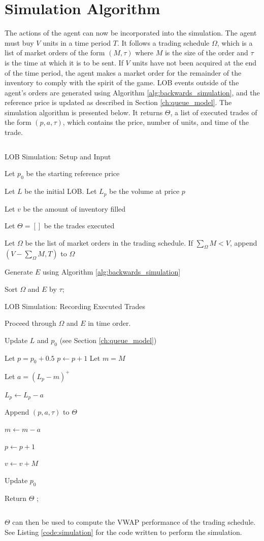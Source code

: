\section{Simulation Algorithm} \label{ch:simulation_algorithm}

The actions of the agent can now be incorporated into the simulation. The agent must buy $V$ units in a time period $T$. It follows a trading schedule $\Omega$, which is a list of market orders of the form $(M,\tau)$ where $M$ is the size of the order and $\tau$ is the time at which it is to be sent. If $V$ units have not been acquired at the end of the time period, the agent makes a market order for the remainder of the inventory to comply with the spirit of the game. LOB events outside of the agent's orders are generated using Algorithm \ref{alg:backwards_simulation}, and the reference price is updated as described in Section \ref{ch:queue_model}. The simulation algorithm is presented below. It returns $\Theta$, a list of executed trades of the form $(p,a,\tau)$, which contains the price, number of units, and time of the trade.

$$ $$

\begin{algorithm}[H]
\SetAlgoLined
\caption{LOB Simulation: Setup and Input}
Let $p_0$ be the starting reference price \;

Let $L$ be the initial LOB. Let $L_p$ be the volume at price $p$ \;

Let $v$ be the amount of inventory filled \;

Let $\Theta = []$ be the trades executed \;

Let $\Omega$ be the list of market orders in the trading schedule. If $\sum\limits_\Omega{M} < V$, append $(V - \sum\limits_\Omega{M}, T)$ to $\Omega$ \;

Generate $E$ using Algorithm \ref{alg:backwards_simulation} \;

Sort $\Omega$ and $E$ by $\tau$;
\end{algorithm}

\begin{algorithm}[H]
\SetAlgoLined
\caption{LOB Simulation: Recording Executed Trades}
Proceed through $\Omega$ and $E$ in time order. 

 {
     {
        Update $L$ and $p_0$ (see Section \ref{ch:queue_model}) \;
    }
     {
        Let $p = p_0 + 0.5$ \;
         {
            $p \leftarrow p + 1$
        }
        Let $m = M$ \;
         {
            Let $a = (L_p - m)^+$ \;
            
            $L_p \leftarrow L_p - a$ \;
            
            Append $(p, a, \tau)$ to $\Theta$ \;

            $m \leftarrow m - a$ \;
    
            $p \leftarrow p + 1$ \;
        }
        $v \leftarrow v + M$ \;
        
        Update $p_0$ \;
    }
}

Return $\Theta$ ;
\end{algorithm}

$$ $$

$\Theta$ can then be used to compute the VWAP performance of the trading schedule. See Listing \ref{code:simulation} for the code written to perform the simulation.